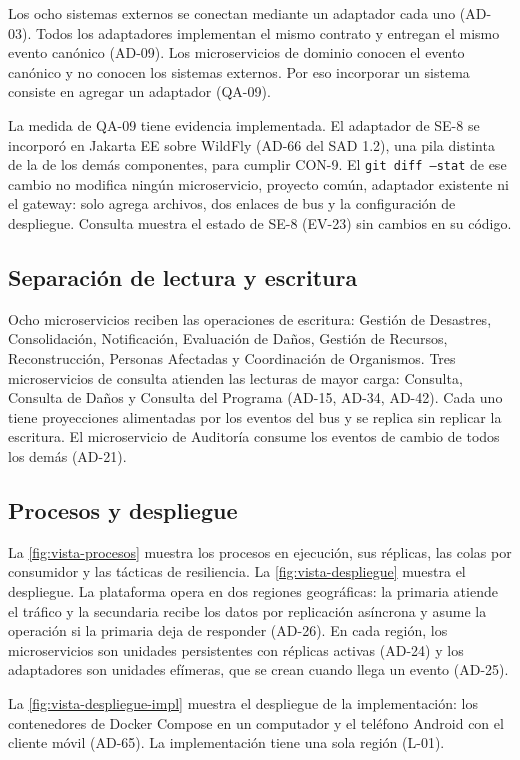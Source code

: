 \documentclass[11pt,letterpaper]{article}
\begin{document}
Los ocho sistemas externos se conectan mediante un adaptador cada uno (AD-03). Todos los
adaptadores implementan el mismo contrato y entregan el mismo evento canónico (AD-09). Los
microservicios de dominio conocen el evento canónico y no conocen los sistemas externos. Por eso
incorporar un sistema consiste en agregar un adaptador (QA-09).

La medida de QA-09 tiene evidencia implementada. El adaptador de SE-8 se
incorporó en Jakarta EE sobre WildFly (AD-66 del SAD 1.2), una pila distinta de la de los demás
componentes, para cumplir CON-9. El \texttt{git diff --stat} de ese cambio no modifica ningún
microservicio, proyecto común, adaptador existente ni el gateway: solo agrega archivos, dos enlaces
de bus y la configuración de despliegue. Consulta muestra el estado de SE-8 (EV-23) sin cambios en
su código.

\subsection{Separación de lectura y escritura}

Ocho microservicios reciben las operaciones de escritura: Gestión de Desastres, Consolidación,
Notificación, Evaluación de Daños, Gestión de Recursos, Reconstrucción, Personas Afectadas y
Coordinación de Organismos. Tres microservicios de consulta atienden las lecturas de mayor carga:
Consulta, Consulta de Daños y Consulta del Programa (AD-15, AD-34, AD-42). Cada uno tiene
proyecciones alimentadas por los eventos del bus y se replica sin replicar la escritura. El
microservicio de Auditoría consume los eventos de cambio de todos los demás (AD-21).

\subsection{Procesos y despliegue}

La \cref{fig:vista-procesos} muestra los procesos en ejecución, sus réplicas, las colas por
consumidor y las tácticas de resiliencia. La \cref{fig:vista-despliegue} muestra el despliegue. La
plataforma opera en dos regiones geográficas: la primaria atiende el tráfico y la secundaria recibe
los datos por replicación asíncrona y asume la operación si la primaria deja de responder (AD-26).
En cada región, los microservicios son unidades persistentes con réplicas activas (AD-24) y los
adaptadores son unidades efímeras, que se crean cuando llega un evento (AD-25).

La \cref{fig:vista-despliegue-impl} muestra el despliegue de la implementación: los contenedores de
Docker Compose en un computador y el teléfono Android con el cliente móvil (AD-65). La
implementación tiene una sola región (L-01).
\end{document}
